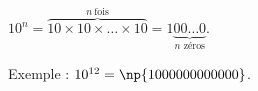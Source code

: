 $10^n = \overbrace{10 \times 10 \times \dots \times 10}^{n\ \text{fois}}
    = 1\underbrace{00\dots0}_{n \text{ zéros}}.$\par\medskip
Exemple : $10^{12} = \np{1000000000000}$.\medskip